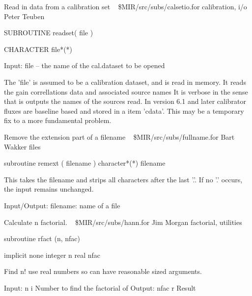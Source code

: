 %
\noindent Read in data from a calibration set
\newline \ 
\newline {} \$MIR/src/subs/calsetio.for
\newline {} calibration, i/o
\newline {} Peter Teuben
\par{\tenpoint
{\eightpoint\begintt
        SUBROUTINE readset( file )

        CHARACTER file*(*)

   Input:
       file --     the name of the cal.dataset to be opened

   The 'file' is assumed to be a calibration dataset, and is read
   in memory. It reads the gain correllations data and associated
   source names
   It is verbose in the sense that is outputs the names of the 
   sources read.
   In version 6.1 and later calibrator fluxes are baseline based and
   stored in a item 'cdata'. This may be a temporary fix to a more
   fundamental problem.
       
\endtt}
\par}
%
\noindent Remove the extension part of a filename
\newline \ 
\newline {} \$MIR/src/subs/fullname.for
\newline {} Bart Wakker
\newline \abox{Keywords:} files
\par{\tenpoint
{\eightpoint\begintt
      subroutine remext ( filename )
      character*(*)  filename

 This takes the filename and strips all characters after the last '.'. If no
 '.' occurs, the input remains unchanged.

  Input/Output:
    filename:    name of a file
\endtt}
\par}
%
\noindent Calculate n factorial.
\newline \ 
\newline {} \$MIR/src/subs/hann.for
\newline \abox{Responsible:} Jim Morgan
\newline {} factorial, utilities
\par{\tenpoint
{\eightpoint\begintt
      subroutine rfact (n, nfac)

      implicit none
      integer n
      real nfac

  Find n!  use real numbers so can have reasonable sized arguments.

  Input:
    n      i     Number to find the factorial of
  Output:
    nfac   r     Result
\endtt}
\par}
